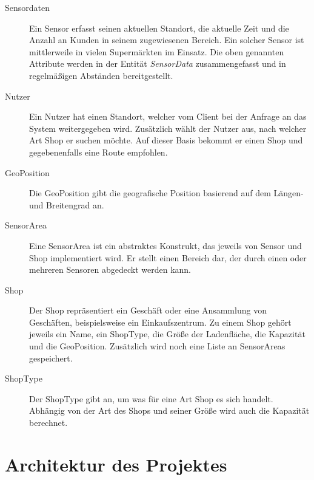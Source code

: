 \documentclass[runningheads]{llncs}
\begin{document}
\begin{description}
	\item[Sensordaten] Ein Sensor erfasst seinen aktuellen Standort, die aktuelle Zeit und die Anzahl an Kunden in seinem zugewiesenen Bereich. Ein solcher Sensor ist mittlerweile in vielen Supermärkten im Einsatz. Die oben genannten Attribute werden in der Entität \textit{SensorData} zusammengefasst und in regelmäßigen Abständen bereitgestellt.
	\item[Nutzer] Ein Nutzer hat einen Standort, welcher vom Client bei der Anfrage an das System weitergegeben wird. Zusätzlich wählt der Nutzer aus, nach welcher Art Shop er suchen möchte. Auf dieser Basis bekommt er einen Shop und gegebenenfalls eine Route empfohlen.
	\item[GeoPosition] Die GeoPosition gibt die geografische Position basierend auf dem Längen- und Breitengrad an.
	\item[SensorArea] Eine SensorArea ist ein abstraktes Konstrukt, das jeweils von Sensor und Shop implementiert wird. 
	Er stellt einen Bereich dar, der durch einen oder mehreren Sensoren abgedeckt werden kann.
	\item[Shop] Der Shop repräsentiert ein Geschäft oder eine Ansammlung von Geschäften, beispielsweise ein Einkaufszentrum. Zu einem Shop gehört jeweils ein Name, ein ShopType, die Größe der Ladenfläche, die Kapazität und die GeoPosition. Zusätzlich wird noch eine Liste an SensorAreas gespeichert.
	\item[ShopType] Der ShopType gibt an, um was für eine Art Shop es sich handelt.
Abhängig von der Art des Shops und seiner Größe wird auch die Kapazität berechnet.
	
\end{description}


\section{Architektur des Projektes}
\end{document}
